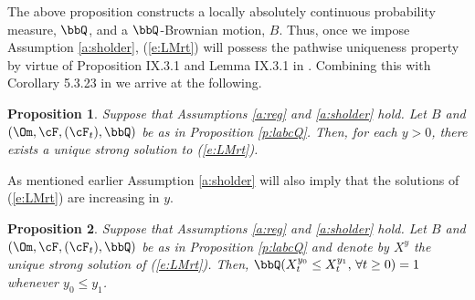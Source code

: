 \documentclass[11pt,reqno]{amsart}
\numberwithin{equation}{section}
\newtheorem{proposition}{Proposition}[section]
\begin{document}
The above proposition constructs a locally absolutely continuous probability measure, $\bbQ$, and a $\bbQ$-Brownian motion, $B$.  Thus, once we impose Assumption \ref{a:sholder}, (\ref{e:LMrt}) will possess the pathwise uniqueness property by virtue of Proposition IX.3.1 and Lemma IX.3.1 in \cite{RY}. Combining this with  Corollary 5.3.23 in \cite{KS} we arrive at the following.
\begin{proposition} Suppose that Assumptions \ref{a:reg} and \ref{a:sholder} hold.  Let $B$ and $(\Om, \cF, (\cF_t), \bbQ)$ be as in Proposition \ref{p:labcQ}. Then, for each $y>0$, there exists a unique strong solution to (\ref{e:LMrt}).
\end{proposition}
As mentioned earlier Assumption \ref{a:sholder} will also imply that the solutions of (\ref{e:LMrt}) are increasing in $y$.
\begin{proposition} Suppose that Assumptions \ref{a:reg} and \ref{a:sholder} hold.  Let $B$ and $(\Om, \cF, (\cF_t), \bbQ)$ be as in Proposition \ref{p:labcQ} and denote by $X^y$ the unique strong solution of (\ref{e:LMrt}). Then, $\bbQ(X^{y_0}_t\leq X^{y_1}_t, \, \forall t \geq 0)=1$ whenever $y_0\leq y_1$.  
\end{proposition}
\end{document}
